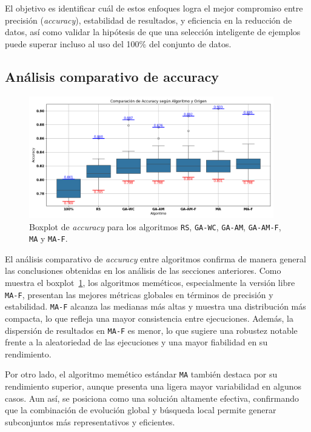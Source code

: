 El objetivo es identificar cuál de estos enfoques logra el mejor compromiso entre precisión (\textit{accuracy}),
estabilidad de resultados, y eficiencia en la reducción de datos, así como validar la hipótesis de que una selección inteligente de ejemplos puede superar incluso al uso del 100\% del conjunto de datos.

\subsection{Análisis comparativo de accuracy}\label{sec:comparacion-final-accuracy}
\begin{figure}[htp]
    \centering
    \includegraphics[width=0.95\textwidth]{imagenes/evaluaciones/final/boxplot-por-algoritmo.png}
    \caption{Boxplot de \textit{accuracy} para los algoritmos \texttt{RS}, \texttt{GA-WC}, \texttt{GA-AM}, \texttt{GA-AM-F}, \texttt{MA} y \texttt{MA-F}.}
    \label{fig:boxplot-comparacion-final}
\end{figure}
El análisis comparativo de \textit{accuracy} entre algoritmos confirma de manera general las conclusiones obtenidas en los análisis de las secciones anteriores.
Como muestra el boxplot~\ref{fig:boxplot-comparacion-final}, los algoritmos meméticos, especialmente la versión libre \texttt{MA-F},
presentan las mejores métricas globales en términos de precisión y estabilidad.
\texttt{MA-F} alcanza las medianas más altas y muestra una distribución más compacta, lo que refleja una mayor consistencia entre ejecuciones.
Además, la dispersión de resultados en \texttt{MA-F} es menor, lo que sugiere una robustez notable frente a la aleatoriedad de las ejecuciones y una mayor fiabilidad en su rendimiento.

Por otro lado, el algoritmo memético estándar \texttt{MA} también destaca por su rendimiento superior,
aunque presenta una ligera mayor variabilidad en algunos casos.
Aun así, se posiciona como una solución altamente efectiva,
confirmando que la combinación de evolución global y búsqueda local permite generar subconjuntos más representativos y eficientes.


